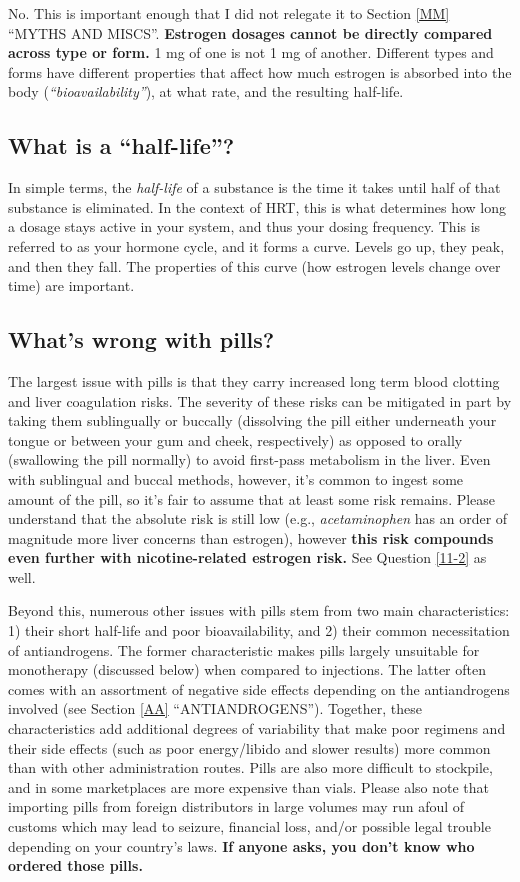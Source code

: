 \documentclass{article}
\begin{document}
No. This is important enough that I did not relegate it to Section \ref{MM} “MYTHS AND MISCS”. \textbf{Estrogen dosages cannot be directly compared across type or form.} 1 mg of one is not 1 mg of another. Different types and forms have different properties that affect how much estrogen is absorbed into the body (\textit{“bioavailability”}), at what rate, and the resulting half-life.

\subsection{What is a “half-life”?}

In simple terms, the \textit{half-life} of a substance is the time it takes until half of that substance is eliminated. In the context of HRT, this is what determines how long a dosage stays active in your system, and thus your dosing frequency. This is referred to as your hormone cycle, and it forms a curve. Levels go up, they peak, and then they fall. The properties of this curve (how estrogen levels change over time) are important.

\subsection{What’s wrong with pills?}

The largest issue with pills is that they carry increased long term blood clotting and liver coagulation risks. The severity of these risks can be mitigated in part by taking them sublingually or buccally (dissolving the pill either underneath your tongue or between your gum and cheek, respectively) as opposed to orally (swallowing the pill normally) to avoid first-pass metabolism in the liver. Even with sublingual and buccal methods, however, it's common to ingest some amount of the pill, so it’s fair to assume that at least some risk remains. Please understand that the absolute risk is still low (e.g., \textit{acetaminophen} has an order of magnitude more liver concerns than estrogen), however \textbf{this risk compounds even further with nicotine-related estrogen risk.} See Question \ref{11-2} as well.

Beyond this, numerous other issues with pills stem from two main characteristics: 1) their short half-life and poor bioavailability, and 2) their common necessitation of antiandrogens. The former characteristic makes pills largely unsuitable for monotherapy (discussed below) when compared to injections. The latter often comes with an assortment of negative side effects depending on the antiandrogens involved (see Section \ref{AA} “ANTIANDROGENS”). Together, these characteristics add additional degrees of variability that make poor regimens and their side effects (such as poor energy/libido and slower results) more common than with other administration routes. Pills are also more difficult to stockpile, and in some marketplaces are more expensive than vials. Please also note that importing pills from foreign distributors in large volumes may run afoul of customs which may lead to seizure, financial loss, and/or possible legal trouble depending on your country's laws. \textbf{If anyone asks, you don't know who ordered those pills.}
\end{document}
